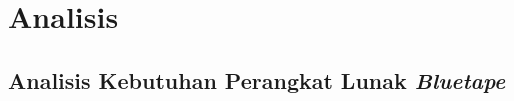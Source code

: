 \chapter{Analisis}
\section{Analisis Kebutuhan Perangkat Lunak \textit{Bluetape}}

\begin{table}[H]
	\centering
	\begin{tabular}{|c|c|c|c|}
	
	\end{tabular}
\end{table}